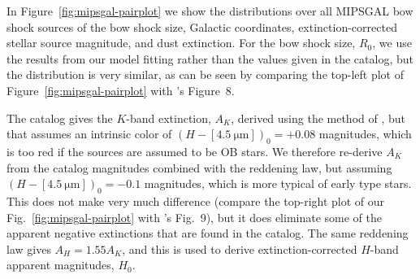 In Figure~\ref{fig:mipsgal-pairplot} we show the distributions over
all MIPSGAL bow shock sources of the bow shock size, Galactic
coordinates, extinction-corrected stellar source magnitude, and dust
extinction.  For the bow shock size, \(R_0\), we use the results from
our model fitting rather than the values given in the
\citet{Kobulnicky:2016a} catalog, but the distribution is very
similar, as can be seen by comparing the top-left plot of
Figure~\ref{fig:mipsgal-pairplot} with \citeauthor{Kobulnicky:2016a}'s
Figure~8.

The catalog gives the \(K\)-band extinction, \(A_K\), derived using
the method of \citet{Majewski:2011a}, but that assumes an intrinsic
color of \((H - [\SI{4.5}{\um}])_0 = +0.08\) magnitudes, which is too
red if the sources are assumed to be OB stars.  We therefore re-derive
\(A_K\) from the catalog magnitudes combined with the
\citet{Indebetouw:2005a} reddening law, but assuming
\((H - [\SI{4.5}{\um}])_0 = -0.1\) magnitudes, which is more typical
of early type stars.  This does not make very much difference (compare
the top-right plot of our Fig.~\ref{fig:mipsgal-pairplot} with
\citeauthor{Kobulnicky:2016a}'s Fig.~9), but it does eliminate some of
the apparent negative extinctions that are found in the catalog.  The
same reddening law gives \(A_H = 1.55 A_K\), and this is used to
derive extinction-corrected \(H\)-band apparent magnitudes, \(H_0\).

